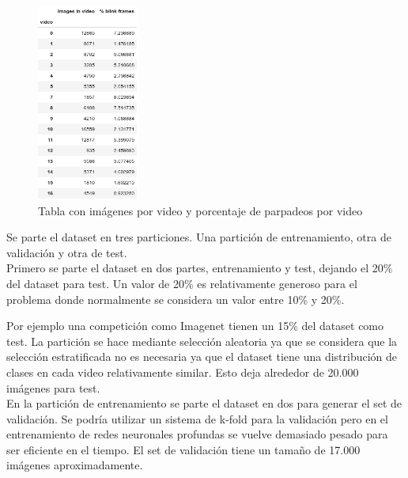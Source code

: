 \documentclass[12pt]{article}
\begin{document}
    \begin{figure} %
        \centering
        \includegraphics[width=0.3\textwidth]{drtA5y}
        \caption{Tabla con imágenes por video y porcentaje de parpadeos por video}
    \end{figure}

    Se parte el dataset en tres particiones.
    Una partición de entrenamiento, otra de validación y otra de test.\\
    Primero se parte el dataset en dos partes, entrenamiento y test, dejando el 20\% del dataset para test.
    Un valor de 20\% es relativamente generoso para el problema donde normalmente se considera un valor entre 10\% y
    20\%.

    Por ejemplo una competición como Imagenet tienen un 15\% del dataset como test\cite{imageNet}.
    La partición se hace mediante selección aleatoria ya que se considera que la selección estratificada no es
    necesaria ya que el dataset tiene una distribución de clases en cada video relativamente similar.
    Esto deja alrededor de 20.000 imágenes para test.\\
    En la partición de entrenamiento se parte el dataset en dos para generar el set de validación.
    Se podría utilizar un sistema de k-fold para la validación pero en el entrenamiento de redes neuronales
    profundas se vuelve demasiado pesado para ser eficiente en el tiempo.
    El set de validación tiene un tamaño de 17.000 imágenes aproximadamente.
\end{document}
